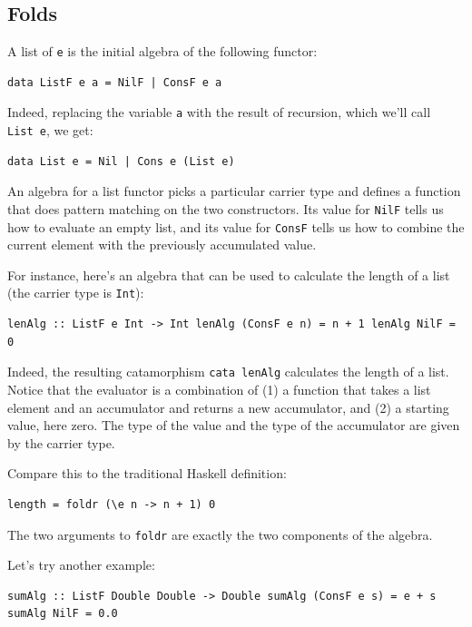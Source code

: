 \subsection{Folds}\label{folds}

A list of \texttt{e} is the initial algebra of the following functor:

\begin{verbatim}
data ListF e a = NilF | ConsF e a
\end{verbatim}

Indeed, replacing the variable \texttt{a} with the result of recursion,
which we'll call \texttt{List\ e}, we get:

\begin{verbatim}
data List e = Nil | Cons e (List e)
\end{verbatim}

An algebra for a list functor picks a particular carrier type and
defines a function that does pattern matching on the two constructors.
Its value for \texttt{NilF} tells us how to evaluate an empty list, and
its value for \texttt{ConsF} tells us how to combine the current element
with the previously accumulated value.

For instance, here's an algebra that can be used to calculate the length
of a list (the carrier type is \texttt{Int}):

\begin{verbatim}
lenAlg :: ListF e Int -> Int lenAlg (ConsF e n) = n + 1 lenAlg NilF = 0
\end{verbatim}

Indeed, the resulting catamorphism \texttt{cata\ lenAlg} calculates the
length of a list. Notice that the evaluator is a combination of (1) a
function that takes a list element and an accumulator and returns a new
accumulator, and (2) a starting value, here zero. The type of the value
and the type of the accumulator are given by the carrier type.

Compare this to the traditional Haskell definition:

\begin{verbatim}
length = foldr (\e n -> n + 1) 0
\end{verbatim}

The two arguments to \texttt{foldr} are exactly the two components of
the algebra.

Let's try another example:

\begin{verbatim}
sumAlg :: ListF Double Double -> Double sumAlg (ConsF e s) = e + s sumAlg NilF = 0.0
\end{verbatim}

